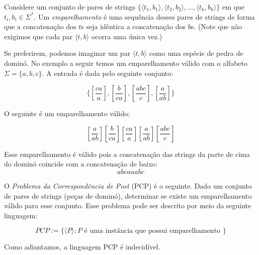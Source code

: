\begin{example}
  Considere um conjunto de pares de strings $\{\langle t_1, b_1 \rangle, \langle t_2, b_2 \rangle, \dots, \langle t_k, b_k \rangle\}$ em que $t_i, b_i \in \Sigma^*$.
  Um {\em emparelhamento} é uma sequência desses pares de strings de forma que a concatenação dos $t$s seja idêntica a concatenação dos $b$s.
  (Note que não exigimos que cada par $\langle t, b \rangle$ ocorra uma única vez.)

  Se preferirem, podemos imaginar um par $\langle t, b \rangle$ como uma espécie de pedra de dominó.
  No exemplo a seguir temos um emparelhamento válido com o alfabeto $\Sigma = \{a,b,c\}$.
  A entrada é dada pelo seguinte conjunto:

  \begin{displaymath}
    \Big\{  \left[\frac{ca}{a}\right], \left[\frac{b}{ca}\right], \left[\frac{abc}{c}\right], \left[\frac{a}{ab}\right] \Big\}
  \end{displaymath}

  O seguinte é um emparelhamento válido:

  \begin{displaymath}
    \left[\frac{a}{ab}\right] \left[\frac{b}{ca}\right] \left[\frac{ca}{a}\right] \left[\frac{a}{ab}\right] \left[\frac{abc}{c}\right]
  \end{displaymath}

  Esse emparelhamento é válido pois a concatenação das strings da parte de cima do dominó coincide com a concatenação de baixo:
  \begin{displaymath}
    abcaaabc
  \end{displaymath}
  
  O {\em Problema da Correspondência de Post} (PCP) é o seguinte.
  Dado um conjunto de pares de strings (peças de dominó), determinar se existe um emparelhamento válido para esse conjunto.
  Esse problema pode ser descrito por meio da seguinte linguagem:
  
  \begin{displaymath}
    PCP := \{\langle P \rangle : P \textrm{ é uma instância que possui emparelhamento }\}
  \end{displaymath}

  Como adiantamos, a linguagem PCP é indecidível.
\end{example}

